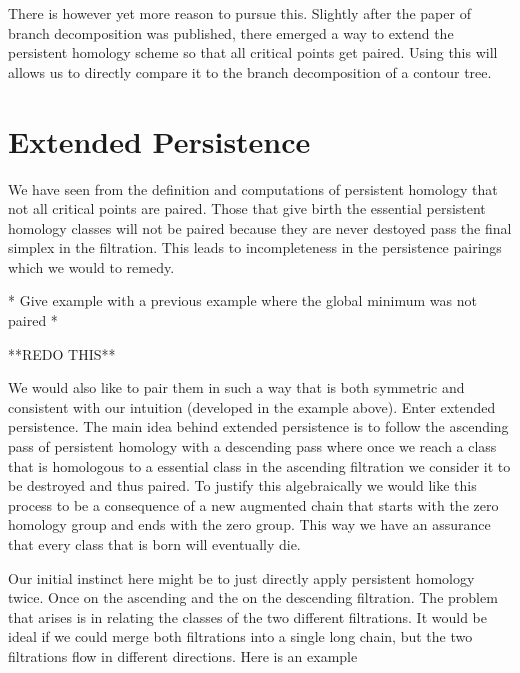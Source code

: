 There is however yet more reason to pursue this. Slightly after the paper of branch decomposition was published, there emerged a way to extend the persistent homology scheme so that all critical points get paired. Using this will allows us to directly compare it to the branch decomposition of a contour tree. 





\section{Extended Persistence}

We have seen from the definition and computations of persistent homology that not all critical points are paired. Those that give birth the essential persistent homology classes will not be paired because they are never destoyed pass the final simplex in the filtration. This leads to incompleteness in the persistence pairings which we would to remedy. 

* Give example with a previous example where the global minimum was not paired *

**REDO THIS**

We would also like to pair them in such a way that is both symmetric and consistent with our intuition (developed in the example above). Enter extended persistence. The main idea behind extended persistence is to follow the ascending pass of persistent homology with a descending pass where once we reach a class that is homologous to a essential class in the ascending filtration we consider it to be destroyed and thus paired. To justify this algebraically we would like this process to be a consequence of a new augmented chain that starts with the zero homology group and ends with the zero group. This way we have an assurance that every class that is born will eventually die.

Our initial instinct here might be to just directly apply persistent homology twice. Once on the ascending and the on the descending filtration. The problem that arises is in relating the classes of the two different filtrations. It would be ideal if we could merge both filtrations into a single long chain, but the two filtrations flow in different directions. Here is an example

